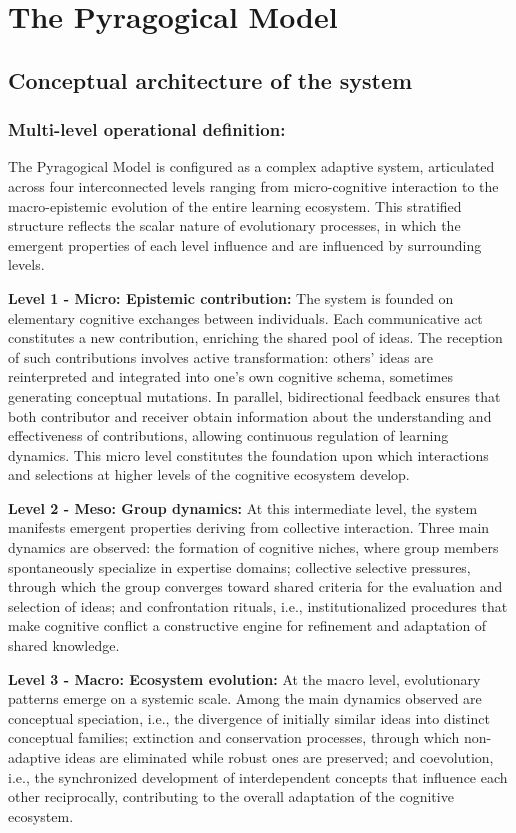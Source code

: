 \chapter{The Pyragogical Model}
\label{pyragogical-model}

\section{Conceptual architecture of the system}
\subsection*{Multi-level operational definition:}

The Pyragogical Model is configured as a complex adaptive system, articulated across four interconnected levels ranging from micro-cognitive interaction to the macro-epistemic evolution of the entire learning ecosystem. This stratified structure reflects the scalar nature of evolutionary processes, in which the emergent properties of each level influence and are influenced by surrounding levels.

\textbf{Level 1 - Micro: Epistemic contribution:} The system is founded on elementary cognitive exchanges between individuals. Each communicative act constitutes a new contribution, enriching the shared pool of ideas. The reception of such contributions involves active transformation: others' ideas are reinterpreted and integrated into one's own cognitive schema, sometimes generating conceptual mutations. In parallel, bidirectional feedback ensures that both contributor and receiver obtain information about the understanding and effectiveness of contributions, allowing continuous regulation of learning dynamics. This micro level constitutes the foundation upon which interactions and selections at higher levels of the cognitive ecosystem develop.

\textbf{Level 2 - Meso: Group dynamics:}
At this intermediate level, the system manifests emergent properties deriving from collective interaction. Three main dynamics are observed: the formation of cognitive niches, where group members spontaneously specialize in expertise domains; collective selective pressures, through which the group converges toward shared criteria for the evaluation and selection of ideas; and confrontation rituals, i.e., institutionalized procedures that make cognitive conflict a constructive engine for refinement and adaptation of shared knowledge.

\textbf{Level 3 - Macro: Ecosystem evolution:}
At the macro level, evolutionary patterns emerge on a systemic scale. Among the main dynamics observed are conceptual speciation, i.e., the divergence of initially similar ideas into distinct conceptual families; extinction and conservation processes, through which non-adaptive ideas are eliminated while robust ones are preserved; and coevolution, i.e., the synchronized development of interdependent concepts that influence each other reciprocally, contributing to the overall adaptation of the cognitive ecosystem.

